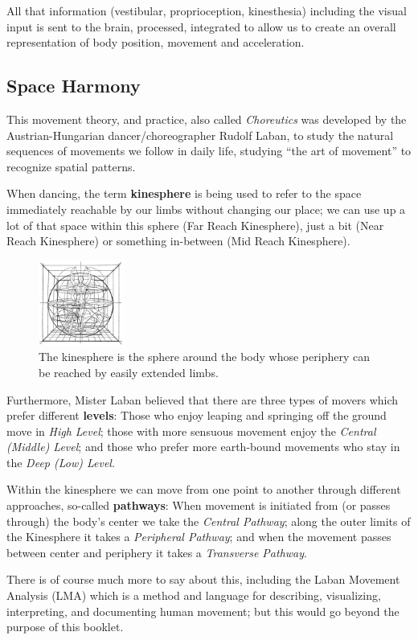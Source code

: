 All that information (vestibular, proprioception, kinesthesia) including the visual input is sent to the brain, processed, integrated to allow us to create an overall representation of body position, movement and acceleration.

\subsection{Space Harmony}\label{subsec:space-harmony}

This movement theory, and practice, also called \textit{Choreutics} was developed by the Austrian-Hungarian dancer/choreographer Rudolf Laban, to study the natural sequences of movements we follow in daily life, studying ``the art of movement'' to recognize spatial patterns.

When dancing, the term \textbf{\gls{kinesphere}} is being used to refer to the space immediately reachable by our limbs without changing our place; we can use up a lot of that space within this sphere (Far Reach Kinesphere), just a bit (Near Reach Kinesphere) or something in-between (Mid Reach Kinesphere).

\begin{figure}
    \centering
    \includegraphics[width=0.25\textwidth]{images/kinsphere}
    \caption{The kinesphere is the sphere around the body whose periphery can be reached by easily extended limbs.}
\end{figure}

Furthermore, Mister Laban believed that there are three types of movers which prefer different \textbf{levels}: Those who enjoy leaping and springing off the ground move in \textit{High Level}; those with more sensuous movement enjoy the \textit{Central (Middle) Level}; and those who prefer more earth-bound movements who stay in the \textit{Deep (Low) Level}.

Within the kinesphere we can move from one point to another through different approaches, so-called \textbf{pathways}: When movement is initiated from (or passes through) the body's center we take the \textit{Central Pathway}; along the outer limits of the Kinesphere it takes a \textit{Peripheral Pathway}; and when the movement passes between center and periphery it takes a \textit{Transverse Pathway}.

There is of course much more to say about this, including the Laban Movement Analysis (LMA) which is a method and language for describing, visualizing, interpreting, and documenting human movement; but this would go beyond the purpose of this booklet.
